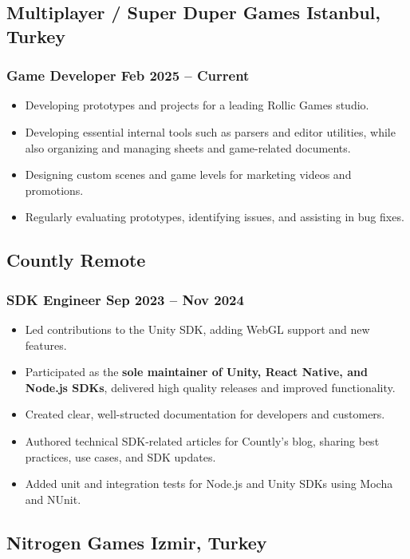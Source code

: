 \documentclass[11pt]{article}
\newcommand{\rside}[1]{
  \hfill {\normalfont\color{accent} #1}%
}
\begin{document}
\subsection{Multiplayer / Super Duper Games \rside{Istanbul, Turkey}}
\subsubsection{Game Developer \rside{Feb 2025 -- Current}}
\begin{itemize}
  \item Developing prototypes and projects for a leading Rollic Games studio.
  \item Developing essential internal tools such as parsers and editor utilities, while also organizing and managing sheets and game-related documents.
  \item Designing custom scenes and game levels for marketing videos and promotions.
  \item Regularly evaluating prototypes, identifying issues, and assisting in bug fixes.
\end{itemize}

\subsection{Countly \rside{Remote}}
\subsubsection{SDK Engineer \rside{Sep 2023 -- Nov 2024}}
\begin{itemize}
  \item Led contributions to the Unity SDK, adding WebGL support and new features.
  \item Participated as the \textbf{sole maintainer of Unity, React Native, and Node.js SDKs}, delivered high quality releases and improved functionality. 
  \item Created clear, well-structed documentation for developers and customers.
  \item Authored technical SDK-related articles for Countly's blog, sharing best practices, use cases, and SDK updates.
  \item Added unit and integration tests for Node.js and Unity SDKs using Mocha and NUnit.
\end{itemize}

\subsection{Nitrogen Games \rside{Izmir, Turkey}}
\end{document}
